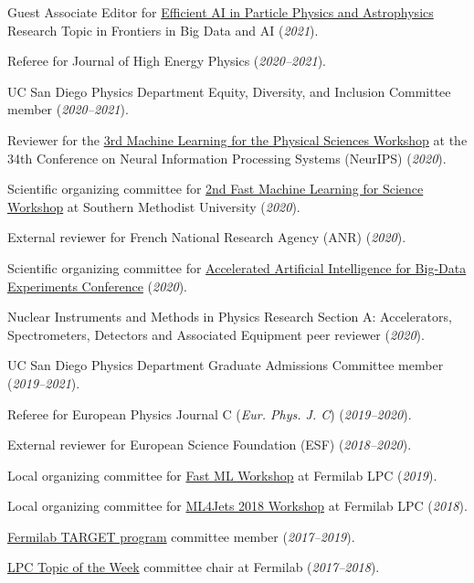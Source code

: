 \documentclass[11pt]{res}
\newif\ifext
\newenvironment{extended}{\ifext}{\fi}
\begin{document}
\begin{resume}
Guest Associate Editor for \href{https://www.frontiersin.org/research-topics/19095/efficient-ai-in-particle-physics-and-astrophysics}{Efficient AI in Particle Physics and Astrophysics} Research Topic in Frontiers in Big Data and AI (\textit{2021}).

Referee for Journal of High Energy Physics (\textit{2020--2021}).

UC San Diego Physics Department Equity, Diversity, and Inclusion Committee member (\textit{2020--2021}).

Reviewer for the \href{https://ml4physicalsciences.github.io/2020/}{3rd Machine Learning for the Physical Sciences Workshop} at the 34th Conference on Neural Information Processing Systems (NeurIPS) (\textit{2020}).

Scientific organizing committee for \href{https://indico.cern.ch/e/fml2020}{2nd Fast Machine Learning for Science Workshop} at Southern Methodist University (\textit{2020}).

External reviewer for French National Research Agency (ANR) (\textit{2020}).

Scientific organizing committee for \href{http://www.ncsa.illinois.edu/Conferences/AcceleratedAINCSA/}{Accelerated Artificial Intelligence for Big-Data Experiments Conference} (\textit{2020}).

Nuclear Instruments and Methods in Physics Research Section A: Accelerators, Spectrometers, Detectors and Associated Equipment peer reviewer (\textit{2020}).

UC San Diego Physics Department Graduate Admissions Committee member (\textit{2019--2021}).

Referee for European Physics Journal C (\emph{Eur. Phys. J. C}) (\textit{2019--2020}).

External reviewer for European Science Foundation (ESF) (\textit{2018--2020}).
\begin{extended}

Local organizing committee for \href{https://indico.cern.ch/e/fml}{Fast ML Workshop} at Fermilab LPC (\textit{2019}).

Local organizing committee for \href{https://indico.cern.ch/e/ml4jets2018}{ML4Jets 2018 Workshop} at Fermilab LPC (\textit{2018}).

\href{http://diversity.fnal.gov/target/}{Fermilab TARGET program} committee member (\textit{2017--2019}).

\href{http://lpc.fnal.gov/programs/topic/}{LPC Topic of the Week} committee chair at Fermilab (\textit{2017--2018}).


\end{extended}
\end{resume}
\end{document}
